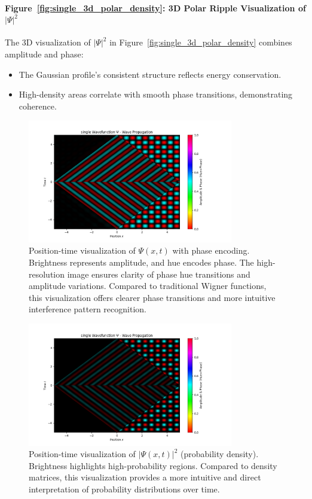 \documentclass[12pt]{article}
\begin{document}
\paragraph{Figure~\ref{fig:single_3d_polar_density}: 3D Polar Ripple Visualization of \(|\Psi|^2\)}
The 3D visualization of \(|\Psi|^2\) in Figure~\ref{fig:single_3d_polar_density} combines amplitude and phase:
\begin{itemize}
    \item The Gaussian profile's consistent structure reflects energy conservation.
    \item High-density areas correlate with smooth phase transitions, demonstrating coherence.
\end{itemize}

\begin{figure}[H]
    \centering
    \includegraphics[width=0.8\textwidth]{images/single_wavefunction_with_phase.png}
    \caption{Position-time visualization of \(\Psi(x,t)\) with phase encoding. Brightness represents amplitude, and hue encodes phase. The high-resolution image ensures clarity of phase hue transitions and amplitude variations. Compared to traditional Wigner functions, this visualization offers clearer phase transitions and more intuitive interference pattern recognition.}
    \label{fig:single_xt}
\end{figure}

\begin{figure}[H]
    \centering
    \includegraphics[width=0.8\textwidth]{images/single_wavefunction_probability_density_with_phase.png}
    \caption{Position-time visualization of \(|\Psi(x,t)|^2\) (probability density). Brightness highlights high-probability regions. Compared to density matrices, this visualization provides a more intuitive and direct interpretation of probability distributions over time.}
    \label{fig:single_xt_density}
\end{figure}
\end{document}
